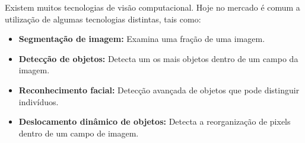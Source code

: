 Existem muitos tecnologias de visão computacional. Hoje no mercado é comum a utilização de algumas tecnologias distintas, tais como:

\begin{itemize}
	\item \textbf{Segmentação de imagem:} Examina uma fração de uma imagem.
	\item \textbf{Detecção de objetos:} Detecta um os mais objetos dentro de um campo da imagem.
	\item \textbf{Reconhecimento facial:} Detecção avançada de objetos que pode distinguir indivíduos.
	\item \textbf{Deslocamento dinâmico de objetos:} Detecta a reorganização de pixels dentro de um campo de imagem.
\end{itemize}
%
%

%



